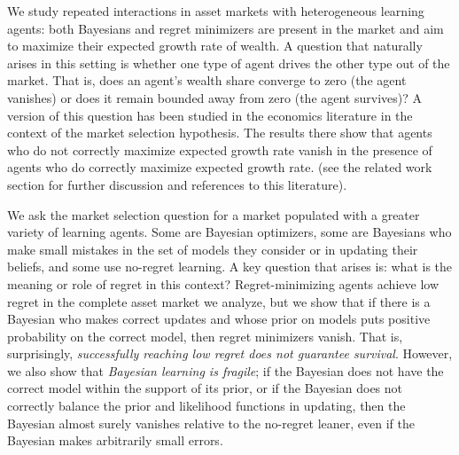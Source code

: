We study repeated interactions in asset markets with heterogeneous learning agents: both Bayesians and regret minimizers are present in the market and aim to maximize their expected growth rate of wealth. A question that naturally arises in this setting is whether one type of agent drives the other type out of the market. That is, does an agent's wealth share converge to zero (the agent vanishes) or does it remain bounded away from zero (the agent survives)? 
A version of this question has been studied in the economics literature in the context of the market selection hypothesis. The results there show that agents who do not correctly maximize expected growth rate vanish in the presence of agents who do correctly maximize expected growth rate.
(see the related work section for further discussion and references to this literature). 

We ask the market selection question for a market populated with a greater variety of learning agents. Some are Bayesian optimizers, some are Bayesians who make small mistakes in the set of models they consider or in updating their beliefs, and some use no-regret learning. A key question that arises is: what is the meaning or role of regret in this context? 
Regret-minimizing agents achieve low regret in the complete asset market we analyze, but we show that if there is a Bayesian who makes correct updates and whose prior on models puts positive probability on the correct model, then regret minimizers vanish. That is, surprisingly, {\em successfully reaching low regret does not guarantee survival}. However, we also show that {\em Bayesian learning is fragile}; if the Bayesian does not have the correct model within the support of its prior, or if the Bayesian does not correctly balance the prior and likelihood functions in updating, then the Bayesian almost surely vanishes relative to the no-regret leaner, even if the Bayesian makes arbitrarily small errors. 
